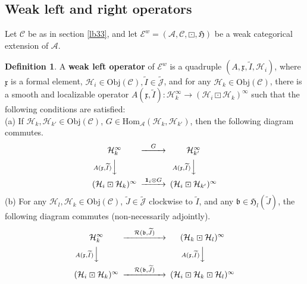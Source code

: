\documentclass[12pt,a4paper]{article}
\theoremstyle{definition}
\newtheorem{df}{Definition}[subsection]
\theoremstyle{plain}
\newcommand{\fk}{\mathfrak}
\newcommand{\mc}{\mathcal}
\newcommand{\wtd}{\widetilde}
\newcommand{\id}{\mathbf{1}}
\newcommand{\Hom}{\mathrm{Hom}}
\newcommand{\scr}{\mathscr}
\newcommand{\Jtd}{\widetilde{\mathcal J}}
\newcommand{\Obj}{\mathrm{Obj}}
\numberwithin{equation}{subsection}
\begin{document}
\subsection{Weak left and right operators}\label{lb48}

Let $\scr C$ be as in section \ref{lb33}, and let $\scr E^w=(\mc A,\scr C,\boxdot,\fk H)$ be a weak categorical extension of $\mc A$.

\begin{df}\label{lb39}
	A \textbf{weak left operator} of $\scr E^w$ is a quadruple $(A,\fk x,\wtd I,\mc H_i)$, where $\fk x$ is a formal element, $\mc H_i\in\Obj(\scr C),\wtd I\in\Jtd$, and for any $\mc H_k\in\Obj(\scr C)$, there is a smooth and localizable operator $A(\fk x,\wtd I):\mc H_k^\infty\rightarrow(\mc H_i\boxdot\mc H_k)^\infty$ such that the following conditions are satisfied:\\
	(a) If $\mc H_k,\mc H_{k'}\in\Obj(\scr C)$, $G\in\Hom_{\mc A}(\mc H_k,\mc H_{k'})$, then  the following diagram commutes.
	\begin{gather}
	\begin{CD}
	\mc H_k^\infty @>G>> \mc H_{k'}^\infty\\
	@V A(\fk x,\wtd I)  VV @V A(\fk x,\wtd I)  VV\\
	(\mc H_i\boxdot\mc H_k)^\infty @> \id_i\otimes G>> (\mc H_i\boxdot\mc H_{k'})^\infty
	\end{CD}
	\end{gather}
	(b) For any $\mc H_l,\mc H_k\in\Obj(\scr C)$,  $\wtd J\in\Jtd$  clockwise to $\wtd I$, and any $\fk b\in\fk H_l(\wtd J)$, the following diagram  commutes (non-necessarily adjointly).
	\begin{align}
	\begin{CD}
	\mc H_k^\infty @> \quad \mc R(\fk b,\wtd J)\quad   >> (\mc H_k\boxdot\mc H_l)^\infty\\
	@V A(\fk x,\wtd I)   V  V @V A(\fk x,\wtd I) VV\\
	(\mc H_i\boxdot\mc H_k)^\infty @> \quad \mc R(\fk b,\wtd J) \quad  >> (\mc H_i\boxdot\mc H_k\boxdot\mc H_l)^\infty
	\end{CD}
	\end{align}
	

\end{df}
\end{document}

